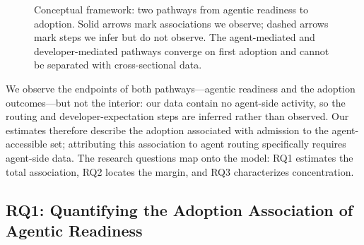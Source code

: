 \begin{figure}[t]
  \centering
  \caption{Conceptual framework: two pathways from agentic readiness to
    adoption. Solid arrows mark associations we observe; dashed arrows mark
    steps we infer but do not observe. The agent-mediated and developer-mediated
    pathways converge on first adoption and cannot be separated with
    cross-sectional data.}
  \label{fig:mechanism}
\end{figure}

We observe the endpoints of both pathways---agentic readiness and the adoption
outcomes---but not the interior: our data contain no agent-side activity, so the
routing and developer-expectation steps are inferred rather than observed. Our
estimates therefore describe the adoption associated with admission to the
agent-accessible set; attributing this association to agent routing
specifically requires agent-side data. The research questions map onto the
model: RQ1 estimates the total association, RQ2 locates the margin, and RQ3
characterizes concentration.

\subsection{RQ1: Quantifying the Adoption Association of Agentic Readiness}
\label{sec:methods}

